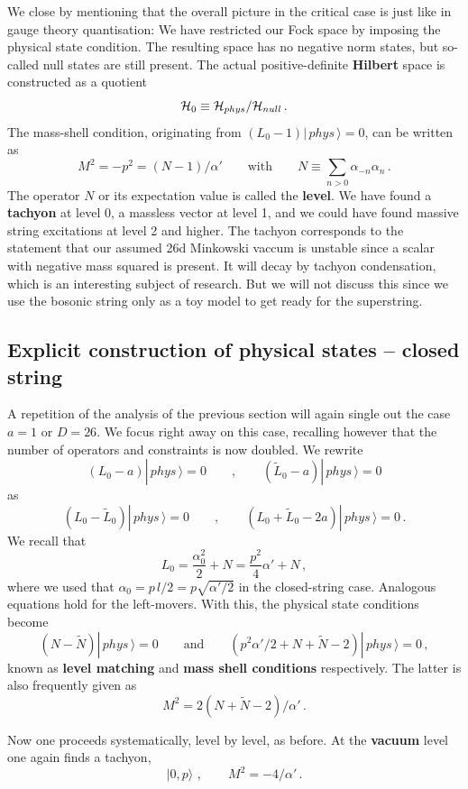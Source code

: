 \documentclass[12pt]{article}
\newcommand{\be}{\begin{equation}}
\newcommand{\ee}{\end{equation}}
\numberwithin{equation}{section}
\begin{document}
We close by mentioning that the overall picture in the critical case is just like in gauge theory quantisation: We have restricted our Fock space by imposing the physical state condition. The resulting space has no negative norm states, but so-called null states are still present. The actual positive-definite {\bf Hilbert} space is constructed as a quotient
\be
{\cal H}_0\equiv {\cal H}_{phys}/{\cal H}_{null}\,.
\ee
The mass-shell condition, originating from $(L_0-1)|\,phys\,\rangle=0$, can be written as 
\be
M^2=-p^2=(N-1)/\alpha'\qquad\mbox{with}\qquad N\equiv \sum_{n>0}\alpha_{-n}\alpha_n\,.
\ee
The operator $N$ or its expectation value is called the {\bf level}. We have found a {\bf tachyon} at level 0, a massless vector at level 1, and we could have found massive string excitations at level 2 and higher. The tachyon corresponds to the statement that our assumed 26d Minkowski vaccum is unstable since a scalar with negative mass squared is present. It will decay by tachyon condensation, which is an interesting subject of research. But we will not discuss this since we use the bosonic string only as a toy model to get ready for the superstring.






\subsection{Explicit construction of physical states -- closed string}

A repetition of the analysis of the previous section will again single out the case $a=1$ or $D=26$. We focus right away on this case, recalling however that the number of operators and constraints is now doubled. We rewrite
\be
(L_0-a)|\,phys\,\rangle=0\qquad,\qquad (\tilde{L}_0-a)|\,phys\,\rangle=0
\ee
as
\be
(L_0-\tilde{L}_0)|\,phys\,\rangle=0\qquad,\qquad (L_0+\tilde{L}_0-2a)|\,phys\,\rangle=0\,. 
\ee
We recall that
\be
L_0=\frac{\alpha_0^2}{2}+N=\frac{p^2}{4}\alpha'+N\,,
\ee
where we used that $\alpha_0=p\,l/2=p\sqrt{\alpha'/2}$ in the closed-string case. Analogous equations hold for the left-movers. With this, the physical state conditions become
\be
(N-\tilde{N})|\,phys\,\rangle=0\qquad\mbox{and}\qquad (p^2\alpha'/2+N+\tilde{N}-2)|\,phys\,\rangle=0 \,,
\ee
known as {\bf level matching} and {\bf mass shell conditions} respectively. The latter is also frequently given as
\be
M^2=2(N+\tilde{N}-2)/\alpha'\,.
\ee

Now one proceeds systematically, level by level, as before. At the {\bf vacuum} level one again finds a tachyon,
\be
|0,p\rangle\,\,,\qquad M^2=-4/\alpha'\,.
\ee
\end{document}
